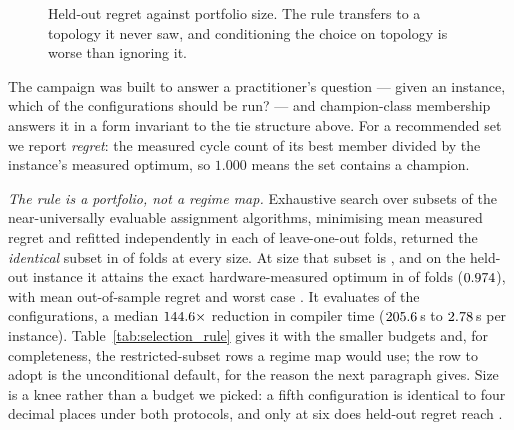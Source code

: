 \documentclass[journal,10pt]{IEEEtran}
\theoremstyle{plain}
\theoremstyle{definition}
\theoremstyle{remark}
\begin{document}
\begin{figure}[!t]\centering

\caption{Held-out regret against portfolio size. The rule transfers to a topology it never saw, and conditioning the choice on topology is worse than ignoring it.}\label{fig:selection}
\end{figure}


The campaign was built to answer a practitioner's question --- given an
instance, which of the \SelConfigsTotal{} configurations should be run? ---
and champion-class membership answers it in a form invariant to the tie
structure above. For a recommended set we report \emph{regret}: the measured
cycle count of its best member divided by the instance's measured optimum, so
$1.000$ means the set contains a champion.

\emph{The rule is a portfolio, not a regime map.} Exhaustive search over
subsets of the \SelSearchAlgs{} near-universally evaluable assignment
algorithms, minimising mean measured regret and refitted independently in each
of \SelFolds{} leave-one-out folds, returned the \emph{identical} subset in
\SelFolds{} of \SelFolds{} folds at every size. At size \SelKFour{} that
subset is \SelPortfolio{}, and on the held-out instance it attains the exact
hardware-measured optimum in \SelKFourOpt{} of \TournNInst{} folds
($0.974$), with mean out-of-sample regret \SelKFourMean{} and worst
case \SelKFourWorst{}. It evaluates \SelConfigsRun{} of the
\SelConfigsTotal{} configurations, a median $144.6\times$ reduction in
compiler time ($205.6$\,s to $2.78$\,s per instance).
Table~\ref{tab:selection_rule} gives it with the smaller budgets and, for
completeness, the restricted-subset rows a regime map would use; the row to
adopt is the unconditional default, for the reason the next paragraph gives.
Size
\SelKnee{} is a knee rather than a budget we picked: a fifth configuration is
identical to four decimal places under both protocols, and only at six does
held-out regret reach \SelKSixMean{}.
\end{document}
